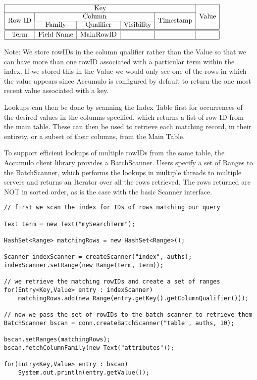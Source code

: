 \begin{center}
$\begin{array}{|c|c|c|c|c|c|} \hline
\multicolumn{5}{|c|}{\mbox{Key}} & \multirow{3}{*}{\mbox{Value}}\\ \cline{1-5}
\multirow{2}{*}{\mbox{Row ID}}& \multicolumn{3}{|c|}{\mbox{Column}} & \multirow{2}{*}{\mbox{Timestamp}} & \\ \cline{2-4}
& \mbox{Family} & \mbox{Qualifier} & \mbox{Visibility} & & \\ \hline \hline
\mbox{Term} & \mbox{Field Name} & \mbox{MainRowID} & & &\\ \hline
\end{array}$
\end{center}

Note: We store rowIDs in the column qualifier rather than the Value so that we can
have more than one rowID associated with a particular term within the index. If we
stored this in the Value we would only see one of the rows in which the value
appears since Accumulo is configured by default to return the one most recent
value associated with a key.

Lookups can then be done by scanning the Index Table first for occurrences of the
desired values in the columns specified, which returns a list of row ID from the main
table. These can then be used to retrieve each matching record, in their entirety, or a
subset of their columns, from the Main Table.

To support efficient lookups of multiple rowIDs from the same table, the Accumulo
client library provides a BatchScanner. Users specify a set of Ranges to the
BatchScanner, which performs the lookups in multiple threads to multiple servers
and returns an Iterator over all the rows retrieved. The rows returned are NOT in
sorted order, as is the case with the basic Scanner interface.

\small
\begin{verbatim}
// first we scan the index for IDs of rows matching our query

Text term = new Text("mySearchTerm");

HashSet<Range> matchingRows = new HashSet<Range>();

Scanner indexScanner = createScanner("index", auths);
indexScanner.setRange(new Range(term, term));

// we retrieve the matching rowIDs and create a set of ranges
for(Entry<Key,Value> entry : indexScanner)
    matchingRows.add(new Range(entry.getKey().getColumnQualifier()));

// now we pass the set of rowIDs to the batch scanner to retrieve them
BatchScanner bscan = conn.createBatchScanner("table", auths, 10);

bscan.setRanges(matchingRows);
bscan.fetchColumnFamily(new Text("attributes"));

for(Entry<Key,Value> entry : bscan)
    System.out.println(entry.getValue());
\end{verbatim}
\normalsize

